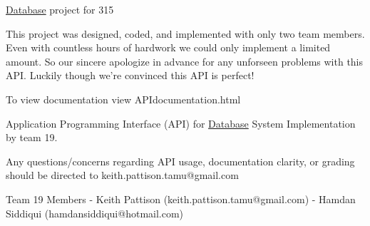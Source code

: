 \hyperlink{class_database}{Database} project for 315

This project was designed, coded, and implemented with only two team members. Even with countless hours of hardwork we could only implement a limited amount. So our sincere apologize in advance for any unforseen problems with this A\-P\-I. Luckily though we're convinced this A\-P\-I is perfect!

To view documentation view A\-P\-Idocumentation.\-html

Application Programming Interface (A\-P\-I) for \hyperlink{class_database}{Database} System Implementation by team 19. \begin{DoxyVerb}Any questions/concerns regarding API usage, documentation clarity, or grading should be directed to keith.pattison.tamu@gmail.com

Team 19 Members
- Keith Pattison (keith.pattison.tamu@gmail.com)
- Hamdan Siddiqui (hamdansiddiqui@hotmail.com)\end{DoxyVerb}
 